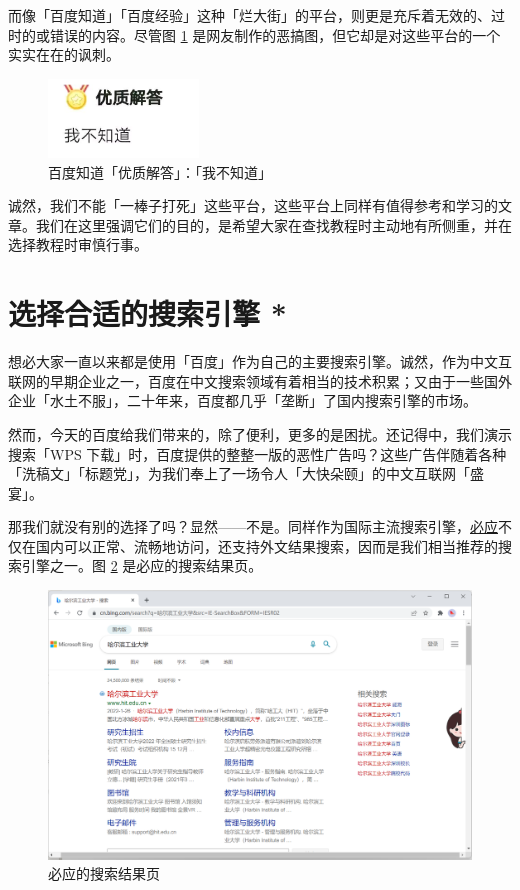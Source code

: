 而像「百度知道」「百度经验」这种「烂大街」的平台，则更是充斥着无效的、过时的或错误的内容。尽管图 \ref{Baidu_zhidao} 是网友制作的恶搞图，但它却是对这些平台的一个实实在在的讽刺。

\begin{figure}[H]
  \centering
  \includegraphics[width=4cm]{assets/Baidu_zhidao.png}
  \caption{百度知道「优质解答」：「我不知道」}
  \label{Baidu_zhidao}
\end{figure}

诚然，我们不能「一棒子打死」这些平台，这些平台上同样有值得参考和学习的文章。我们在这里强调它们的目的，是希望大家在查找教程时主动地有所侧重，并在选择教程时审慎行事。

\section{选择合适的搜索引擎 *}

想必大家一直以来都是使用「百度」作为自己的主要搜索引擎。诚然，作为中文互联网的早期企业之一，百度在中文搜索领域有着相当的技术积累；又由于一些国外企业「水土不服」，二十年来，百度都几乎「垄断」了国内搜索引擎的市场。

然而，今天的百度给我们带来的，除了便利，更多的是困扰。还记得中，我们演示搜索「WPS 下载」时，百度提供的整整一版的恶性广告吗？这些广告伴随着各种「洗稿文」「标题党」，为我们奉上了一场令人「大快朵颐」的中文互联网「盛宴」。

那我们就没有别的选择了吗？显然——不是。同样作为国际主流搜索引擎，\href{https://cn.bing.com/}{必应}不仅在国内可以正常、流畅地访问，还支持外文结果搜索，因而是我们相当推荐的搜索引擎之一。图 \ref{Bing_1} 是必应的搜索结果页。

\begin{figure}[htb!]
  \centering
  \includegraphics[width=12cm]{assets/Bing_1.png}
  \caption{必应的搜索结果页}
  \label{Bing_1}
\end{figure}

